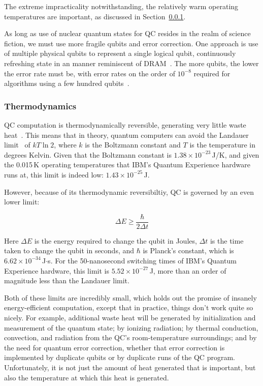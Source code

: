 The extreme impracticality notwithstanding, the relatively warm operating
temperatures are important, as discussed in
Section~\ref{sec:future:Thermodynamics}.

As long as use of nuclear quantum states for QC resides in the
realm of science fiction, we must use more fragile qubits
and error correction.
One approach is use of multiple physical qubits to represent
a single logical qubit, continuously refreshing state in an
manner reminiscent of DRAM~\cite{DanielThomasSankPhD}.
The more qubits, the lower the error rate must be, with error
rates on the order of $10^{-8}$ required for algorithms using
a few hundred qubits~\cite{DanielThomasSankPhD}.

\subsubsection{Thermodynamics}
\label{sec:future:Thermodynamics}

QC computation is thermodynamically reversible, generating
very little waste heat~\cite{Bennett:1973:LRC:1664562.1664568,RichardFeynman1986QuantumMechanicalComputers}.
This means that in theory, quantum computers can avoid the
Landauer limit~\cite{Landauer:1961:IHG:1661184.1661186}
of $kT \ln 2$, where $k$ is the Boltzmann constant and $T$ is the
temperature in degrees Kelvin.
Given that the Boltzmann constant is $1.38 \times 10^{-23}$\,J/K,
and given the 0.015\,K operating temperatures that IBM's Quantum Experience
hardware runs at, this limit is indeed low: $1.43 \times 10^{-25}$\,J.

However, because of its thermodynamic reversibiltiy,
QC is governed by an even lower limit:

\begin{equation}
	\Delta E \geq \frac{\hbar}{2 \Delta t}
\end{equation}

Here $\Delta E$ is the energy required to change the qubit in Joules,
$\Delta t$ is the time taken to change the qubit in seconds, and
$\hbar$ is Planck's constant, which is $6.62 \times 10^{-34}$\,J$\cdot$s.
For the 50-nanosecond switching times of IBM's Quantum Experience
hardware, this limit is $5.52 \times 10^{-27}$\,J, more than an order
of magnitude less than the Landauer limit.

Both of these limits are incredibly small, which holds out the promise
of insanely energy-efficient computation, except that
in practice, things don't work quite so nicely.
For example, additional waste heat will be generated
by initialization and measurement of the quantum state;
by ionizing radiation;
by thermal conduction, convection, and radiation from
the QC's room-temperature surroundings;
and
by the need for quantum error correction, whether that error correction
is implemented by duplicate qubits or by duplicate runs of the QC
program.
Unfortunately, it is not just the amount of heat generated that is
important, but also the temperature at which this heat is generated.

